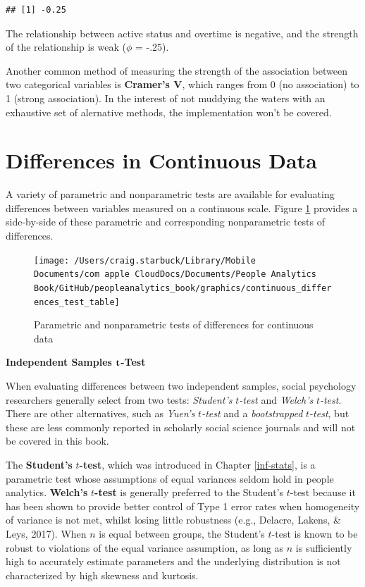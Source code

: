 \documentclass[
]{book}
\begin{document}
\begin{verbatim}
## [1] -0.25
\end{verbatim}

The relationship between active status and overtime is negative, and the strength of the relationship is weak (\(\phi\) = -.25).

Another common method of measuring the strength of the association between two categorical variables is \textbf{Cramer's V}, which ranges from 0 (no association) to 1 (strong association). In the interest of not muddying the waters with an exhaustive set of alernative methods, the implementation won't be covered.

\hypertarget{differences-in-continuous-data}{%
\section{Differences in Continuous Data}\label{differences-in-continuous-data}}

A variety of parametric and nonparametric tests are available for evaluating differences between variables measured on a continuous scale. Figure \ref{fig:continuous-tests} provides a side-by-side of these parametric and corresponding nonparametric tests of differences.

\begin{figure}

{\centering \texttt{[image: /Users/craig.starbuck/Library/Mobile Documents/com~apple~CloudDocs/Documents/People Analytics Book/GitHub/peopleanalytics\_book/graphics/continuous\_differences\_test\_table]} 

}

\caption{Parametric and nonparametric tests of differences for continuous data}\label{fig:continuous-tests}
\end{figure}

\textbf{Independent Samples }\(\textbf t\)\textbf{-Test}

When evaluating differences between two independent samples, social psychology researchers generally select from two tests: \emph{Student's} \(t\)\emph{-test} and \emph{Welch's} \(t\)\emph{-test}. There are other alternatives, such as \emph{Yuen's} \(t\)\emph{-test} and a \emph{bootstrapped} \(t\)\emph{-test}, but these are less commonly reported in scholarly social science journals and will not be covered in this book.

The \textbf{Student's} \(t\)\textbf{-test}, which was introduced in Chapter \ref{inf-stats}, is a parametric test whose assumptions of equal variances seldom hold in people analytics. \textbf{Welch's} \(t\)\textbf{-test} is generally preferred to the Student's \(t\)-test because it has been shown to provide better control of Type 1 error rates when homogeneity of variance is not met, whilst losing little robustness (e.g., Delacre, Lakens, \& Leys, 2017). When \(n\) is equal between groups, the Student's \(t\)-test is known to be robust to violations of the equal variance assumption, as long as \(n\) is sufficiently high to accurately estimate parameters and the underlying distribution is not characterized by high skewness and kurtosis.
\end{document}
